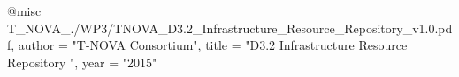 @misc{ T_NOVA_./WP3/TNOVA_D3.2_Infrastructure_Resource_Repository_v1.0.pdf,
       author = "{T-NOVA Consortium}",
       title = "D3.2 Infrastructure Resource Repository ",
       year = "2015" }
